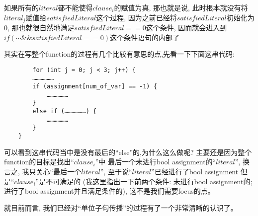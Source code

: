         如果所有的$literal$都不能使得$clause_{i}$的赋值为真,
        那也就是说,
        此时根本就没有将$literal_{j}$赋值给$satisfiedLiteral$这个过程,
        因为之前已经将$satisfiedLiteral$初始化为0,
        那也就很自然地满足$satisfiedLiteral==0$这个条件,
        因而就会进入到$if(\cdots \&\& satisfiedLiteral ==0)$这个条件语句的内部了
        \par
        其实在写整个function的过程有几个比较有意思的点,先看一下下面这串代码:
        \begin{lstlisting}
        for (int j = 0; j < 3; j++) {
        ………………
        if (assignment[num_of_var] == -1) {  
            ………………
        } 
        else if (………………) {
            ………………
        }
    }
        \end{lstlisting}
        \par
        可以看到这串代码当中是没有最后的``else''的,为什么这么做呢?
        主要还是因为整个function的目标是找出``$clause_{i}$''中
        最后一个未进行bool assignment的``$literal$'',
        换言之,
        我只关心``最后一个$literal$'',
        至于说``$literal$''已经进行了bool assignment
        但是``$clause_{i}$''是不可满足的
        (我这里指出一下前两个条件:
        未进行bool assignment的;
        进行了bool assignment并且满足条件的),
        这不是我们需要focus的点。
        \par
        就目前而言,
        我们已经对``单位子句传播''的过程有了一个非常清晰的认识了。
        
